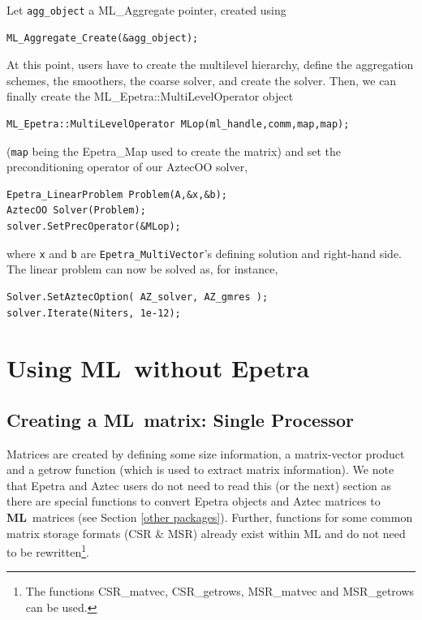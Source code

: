 \documentclass{article}[11pt]
\newcommand{\ML}     {{\bf ML}}
\begin{document}
Let \verb!agg_object! a ML\_Aggregate pointer, created using
\begin{verbatim}
ML_Aggregate_Create(&agg_object);
\end{verbatim}
At this point, users have to create the multilevel hierarchy, define the
aggregation schemes, the smoothers, the coarse solver, and create the solver.
Then, we can finally create the ML\_Epetra::MultiLevelOperator object
\begin{verbatim}
ML_Epetra::MultiLevelOperator MLop(ml_handle,comm,map,map);
\end{verbatim}
(\verb!map! being the Epetra\_Map used to create the matrix) and set the
preconditioning operator of our {\sc AztecOO} solver,
\begin{verbatim}
Epetra_LinearProblem Problem(A,&x,&b);
AztecOO Solver(Problem);
solver.SetPrecOperator(&MLop);
\end{verbatim}
where \verb!x! and \verb!b! are \verb!Epetra_MultiVector!'s defining
solution and right-hand side. The linear problem can now be solved as,
for instance,
\begin{verbatim}
Solver.SetAztecOption( AZ_solver, AZ_gmres );
solver.Iterate(Niters, 1e-12);
\end{verbatim}


\section{Using \ML\ without Epetra}
\label{sec:without_Epetra}

\subsection{Creating a \ML\ matrix: Single Processor}
\label{single}

Matrices are created by defining some size information, a matrix-vector
product and a getrow function (which is used to extract matrix
information).  We note that {\sc Epetra} and {\sc Aztec} users do not
need to read this (or the next) section as there are special functions
to convert {\sc Epetra} objects and {\sc Aztec} matrices to \ML\ matrices (see
Section \ref{other packages}). Further, functions for
some common matrix storage formats (CSR \& MSR) already exist within ML
and do not need to be rewritten\footnote{The functions {\sf
    CSR\_matvec}, {\sf CSR\_getrows}, {\sf MSR\_matvec} and {\sf
    MSR\_getrows} can be used.}.
\end{document}
